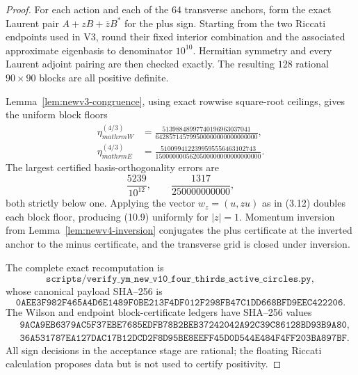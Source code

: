 \documentclass[11pt,oneside]{article}
\theoremstyle{definition}
\theoremstyle{remark}
\begin{document}
\begin{proof}
For each action and each of the \(64\) transverse anchors, form the
exact Laurent pair \(A+zB+\bar zB^*\) for the plus sign.  Starting
from the two Riccati endpoints used in V3, round their fixed interior
combination and the associated approximate eigenbasis to denominator
\(10^{10}\).  Hermitian symmetry and every Laurent adjoint pairing
are then checked exactly.  The resulting \(128\) rational
\(90\times90\) blocks are all positive definite.

Lemma~\ref{lem:newv3-congruence}, using exact rowwise square-root
ceilings, gives the uniform block floors
\[
\begin{aligned}
 \eta_{mathrm W}^{(4/3)}
 &=\frac{51398848997740196963037041}
 {642857145799500000000000000000},\\
 \eta_{mathrm E}^{(4/3)}
 &=\frac{5100994122399595556463102743}
 {1500000005620500000000000000000}.
\end{aligned}                                             \tag{10.13}
\]
The largest certified basis-orthogonality errors are
\[
 \frac{5239}{10^{12}},\qquad
 \frac{1317}{250000000000},                              \tag{10.14}
\]
both strictly below one.  Applying the vector
\(w_z=(u,zu)\) as in (3.12) doubles each block floor, producing
(10.9) uniformly for \(|z|=1\).  Momentum inversion from
Lemma~\ref{lem:newv4-inversion} conjugates the plus certificate at
the inverted anchor to the minus certificate, and the transverse
grid is closed under inversion.

The complete exact recomputation is
\[
\texttt{scripts/verify\_ym\_new\_v10\_four\_thirds\_active\_circles.py},
\]
whose canonical payload SHA--256 is
\[
\texttt{0AEE3F982F465A4D6E1489F0BE213F4DF012F298FB47C1DD668BFD9EEC422206}.
                                                               \tag{10.15}
\]
The Wilson and endpoint block-certificate ledgers have SHA--256
values
\[
\begin{aligned}
&\texttt{9ACA9EB6379AC5F37EBE7685EDFB78B2BEB37242042A92C39C86128BD93B9A80},\\
&\texttt{36A531787EA127DAC17B12DCD2F8D95BE8EEFF45D0D544E484F4FF203BA897BF}.
\end{aligned}                                             \tag{10.16}
\]
All sign decisions in the acceptance stage are rational; the
floating Riccati calculation proposes data but is not used to certify
positivity.
\end{proof}
\end{document}
